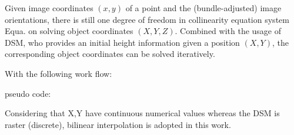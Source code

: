 Given image coordinates $(x,y)$ of a point and the (bundle-adjusted) image orientations, there is still one degree of freedom in collinearity equation system Equa. on solving object coordinates $(X,Y,Z)$. Combined with the usage of DSM, who provides an initial height information given a position $(X,Y)$, the corresponding object coordinates can be solved iteratively.

With the following work flow:

pseudo code:















Considering that X,Y have continuous numerical values whereas the DSM is raster (discrete), bilinear interpolation is adopted in this work.

